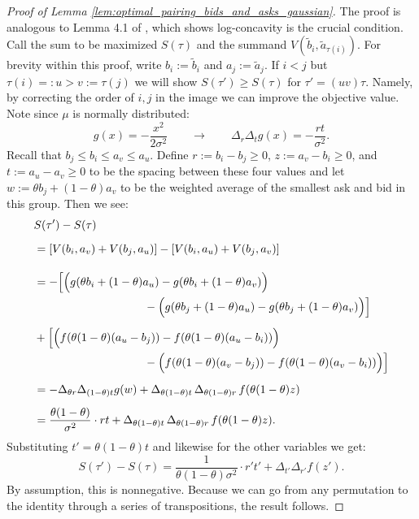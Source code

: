 \begin{proof}[Proof of Lemma \ref{lem:optimal_pairing_bids_and_asks_gaussian}]
    The proof is analogous to Lemma 4.1 of \cite{bobkov2009_one_dimensional_measures_kantorovich}, which shows log-concavity is the crucial condition. Call the sum to be maximized $S(\tau)$ and the summand $V(\widetilde b_i,\widetilde a_{\tau(i)})$. For brevity within this proof, write $b_i:=\widetilde b_i$ and $a_j:=\widetilde a_j$. If $i < j$ but $\tau(i) =: u > v := \tau(j)$ we will show $S(\tau') \geq S(\tau)$ for $\tau' = (uv) \tau$. Namely, by correcting the order of $i,j$ in the image we can improve the objective value. Note since $\mu$ is normally distributed:
    \[ g(x) = -\frac{x^2}{2\sigma^2} \qquad \to \qquad  \Delta_r \Delta_t g(x) = - \frac{rt}{\sigma^2}. \]
    \noindent  Recall that $b_j \leq b_i \leq a_v \leq a_u$. Define $r := b_i - b_j \geq 0$, $z := a_v - b_i \geq 0$, and $t := a_u - a_v \geq 0$ to be the spacing between these four values and let $w := \theta b_j + (1-\theta)a_v$ to be the weighted average of the smallest ask and bid in this group. Then we see:
    \begin{align*}
        & S(\tau') - S(\tau) \\[6pt]
        & = \left[ V(b_i, a_v) + V(b_j, a_u) \right] - \left[ V(b_i, a_u) + V(b_j, a_v) \right] \\[1em]
        & = - \Big[ \Big(g(\theta b_i + (1-\theta) a_u) - g(\theta b_i + (1-\theta) a_v) \Big) \\
        &\hspace{3.4cm} - \Big(g(\theta b_j + (1-\theta) a_u) - g(\theta b_j + (1-\theta) a_v) \Big) \Big] \\[5pt]
        & + \Big[ \Big(f(\theta(1-\theta)(a_u - b_j)) - f(\theta(1-\theta)(a_u - b_i)) \Big) \\
        &\hspace{3.4cm} - \Big(f(\theta(1-\theta)(a_v - b_j)) - f(\theta(1-\theta)(a_v - b_i)) \Big) \Big] \\[5pt]
        & = -\Delta_{\theta r} \Delta_{(1-\theta)t} g(w) + \Delta_{\theta(1-\theta) t} \, \Delta_{\theta(1-\theta) r} \, f(\theta(1-\theta) z) \\[5pt]
        & = \frac{\theta (1-\theta)}{\sigma^2} \cdot rt + \Delta_{\theta(1-\theta) t} \, \Delta_{\theta(1-\theta) r} \, f(\theta(1-\theta) z).
    \end{align*}
    \noindent Substituting $t' = \theta(1-\theta)t$ and likewise for the other variables we get:
    \[S(\tau') - S(\tau) = \frac{1}{\theta(1-\theta)\sigma^2} \cdot r't' + \Delta_{t'} \Delta_{r'} f(z').\]
    \noindent By assumption, this is nonnegative. Because we can go from any permutation to the identity through a series of transpositions, the result follows.
\end{proof}

